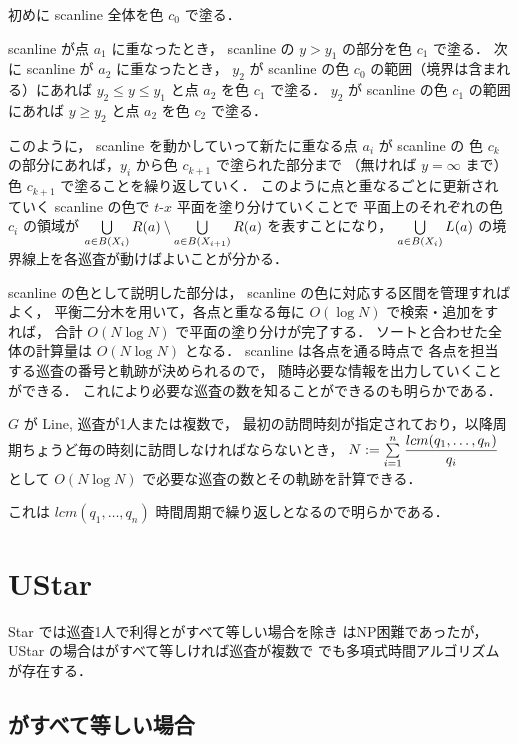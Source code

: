 初めに scanline 全体を色 $c_0$ で塗る．

scanline が点 $a_1$ に重なったとき，
scanline の $y > y_1$ の部分を色 $c_1$ で塗る．
次に scanline が $a_2$ に重なったとき，
$y_2$ が scanline の色 $c_0$ の範囲（境界は含まれる）にあれば
$y_2 \leq y \leq y_1$ と点 $a_2$ を色 $c_1$ で塗る．
$y_2$ が scanline の色 $c_1$ の範囲にあれば
$y \geq y_2$ と点 $a_2$ を色 $c_2$ で塗る．


このように，
scanline を動かしていって新たに重なる点 $a_i$ が scanline の
色 $c_k$ の部分にあれば，$y_i$ から色 $c_{k + 1}$ で塗られた部分まで
（無ければ $y = \infty$ まで）色 $c_{k + 1}$ で塗ることを繰り返していく．
このように点と重なるごとに更新されていく scanline の色で $t$-$x$ 平面を塗り分けていくことで
平面上のそれぞれの色 $c_i$ の領域が
$\bigcup\limits_{a \in B(X_i)} R(a) \setminus \bigcup\limits_{a \in B(X_{i + 1})} R(a)$
を表すことになり，
$\bigcup\limits_{a \in B(X_i)} L(a)$ の境界線上を各巡査が動けばよいことが分かる．

scanline の色として説明した部分は，
scanline の色に対応する区間を管理すればよく，
平衡二分木を用いて，各点と重なる毎に $O(\log N)$ で検索・追加をすれば，
合計 $O(N \log N)$ で平面の塗り分けが完了する．
ソートと合わせた全体の計算量は $O(N \log N)$ となる．
scanline は各点を通る時点で
各点を担当する巡査の番号と軌跡が決められるので，
随時必要な情報を出力していくことができる．
これにより必要な巡査の数を知ることができるのも明らかである．

\begin{coro}
	$G$ が Line,
	巡査が1人または複数で，
	最初の訪問時刻が指定されており，以降周期ちょうど毎の時刻に訪問しなければならないとき，
	$N := \sum\limits_{i = 1}^n \dfrac{lcm(q_1, \ldots, q_n)}{q_i}$
	として $O(N \log N)$ で必要な巡査の数とその軌跡を計算できる．
\end{coro}

これは $lcm(q_1, \ldots, q_n)$ 時間周期で繰り返しとなるので明らかである．





\section{UStar}

Star では巡査1人で利得と{\timelimit}がすべて等しい場合を除き \decisionpp はNP困難であったが，
UStar の場合は{\timelimit}がすべて等しければ巡査が複数で \optpp でも多項式時間アルゴリズムが存在する．


\subsection{{\timelimit}がすべて等しい場合}

